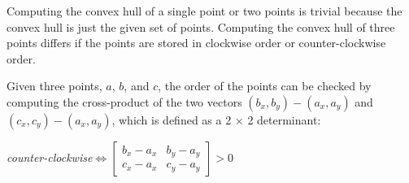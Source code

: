 \documentclass{article}
\begin{document}
Computing the convex hull of a single point or two points is trivial because the convex hull is just the given set of points. Computing the convex hull of three points differs if the points are stored in clockwise order or counter-clockwise order.

Given three points, $a$, $b$, and $c$, the order of the points can be checked by computing the cross-product of the two vectors $(b_x, b_y) - (a_x, a_y)$ and $(c_x, c_y) - (a_x, a_y)$, which is defined as a 2 × 2 determinant:

\begin{center}\textit{counter-clockwise}$ \iff \begin{bmatrix}
b_x - a_x & b_y - a_y\\
c_x - a_x & c_y - a_y
\end{bmatrix} > 0$
\end{center}
\end{document}
